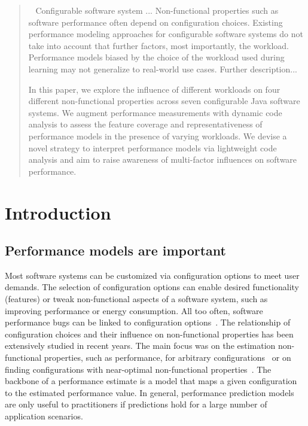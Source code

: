 \begin{abstract}
~ {\color{Orange}Configurable software system ...} Non-functional properties such as software performance often depend on configuration choices. Existing performance modeling approaches for configurable software systems do not take into account that further factors, most importantly, the workload. Performance models biased by the choice of the workload used during learning may not generalize to real-world use cases. {\color{Orange}Further description...}

In this paper, we explore the influence of different workloads on {\color{Orange}four} different non-functional properties across {\color{Orange}seven} configurable Java software systems. We augment performance measurements with dynamic code analysis to assess the feature coverage and representativeness of performance models in the presence of varying workloads. We devise a novel strategy to interpret performance models via lightweight code analysis and aim to raise awareness of multi-factor influences on software performance.
\end{abstract}


\section{Introduction}
\subsection*{Performance models are important}
Most software systems can be customized via configuration options to meet user demands. The selection of configuration options can enable desired functionality (features) or tweak non-functional aspects of a software system, such as improving performance or energy consumption. 
All too often, software performance bugs can be linked to configuration options~\cite{han_empirical_2016}. 
The relationship of configuration choices and their influence on non-functional properties has been extensively studied in recent years. The main focus was on the estimation non-functional properties, such as performance, for arbitrary configurations~\cite{dorn2020,siegmundPerformanceinfluenceModelsHighly2015,haDeepPerf2019,perfAL,guoVariabilityawarePerformancePrediction2013,sarkarCostEfficientSamplingPerformance,guo_2018_data,fourier_learning_2015,perLasso} or on finding configurations with near-optimal non-functional properties~\cite{nairUsingBadLearners2017,nairFlash18,ohFindingNearoptimalConfigurations2017}. 
The backbone of a performance estimate is a model that maps a given configuration to the estimated performance value. 
In general, performance prediction models are only useful to practitioners if predictions hold for a large number of application scenarios.

